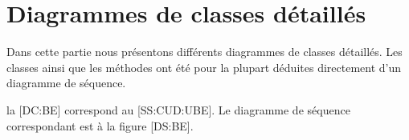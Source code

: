 \chapter{Diagrammes de classes détaillés}

Dans cette partie nous présentons différents diagrammes de classes détaillés.
Les classes ainsi que les méthodes ont été pour la plupart déduites directement d'un diagramme de séquence.

\startitemize
\item la [DC:BE] correspond au \in{\cu}[SS:CUD:UBE].
Le diagramme de séquence correspondant est à la figure [DS:BE].
\stopitemize

